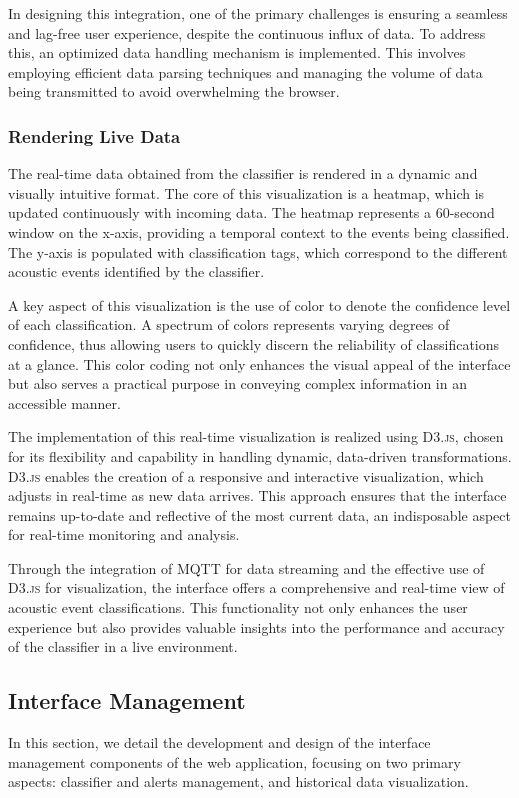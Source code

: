 In designing this integration, one of the primary challenges is ensuring a seamless and lag-free user experience, despite the continuous influx of data. To address this, an optimized data handling mechanism is implemented. This involves employing efficient data parsing techniques and managing the volume of data being transmitted to avoid overwhelming the browser.

\subsubsection{Rendering Live Data}
The real-time data obtained from the classifier is rendered in a dynamic and visually intuitive format. The core of this visualization is a heatmap, which is updated continuously with incoming data. The heatmap represents a 60-second window on the x-axis, providing a temporal context to the events being classified. The y-axis is populated with classification tags, which correspond to the different acoustic events identified by the classifier.

A key aspect of this visualization is the use of color to denote the confidence level of each classification. A spectrum of colors represents varying degrees of confidence, thus allowing users to quickly discern the reliability of classifications at a glance. This color coding not only enhances the visual appeal of the interface but also serves a practical purpose in conveying complex information in an accessible manner.

The implementation of this real-time visualization is realized using \textsc{D3.js}, chosen for its flexibility and capability in handling dynamic, data-driven transformations. \textsc{D3.js} enables the creation of a responsive and interactive visualization, which adjusts in real-time as new data arrives. This approach ensures that the interface remains up-to-date and reflective of the most current data, an indisposable aspect for real-time monitoring and analysis.

Through the integration of MQTT for data streaming and the effective use of \textsc{D3.js} for visualization, the interface offers a comprehensive and real-time view of acoustic event classifications. This functionality not only enhances the user experience but also provides valuable insights into the performance and accuracy of the classifier in a live environment.

\subsection{Interface Management}
In this section, we detail the development and design of the interface management components of the web application, focusing on two primary aspects: classifier and alerts management, and historical data visualization.

